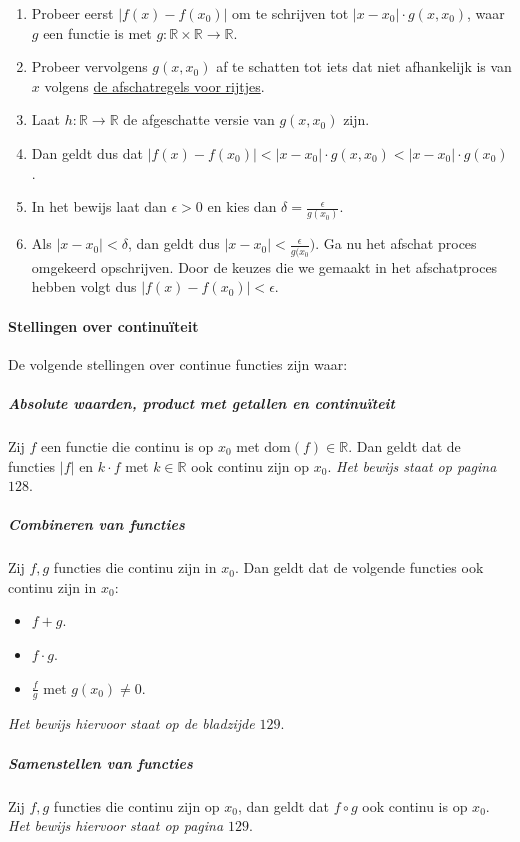 \begin{enumerate}
    \setlength\itemsep{0em}
    \item Probeer eerst $|f(x)-f(x_{0})|$ om te schrijven tot $|x-x_{0}| \cdot g(x,x_{0})$, waar $g$ een functie is met $g:\mathbb{R}\times\mathbb{R}\to\mathbb{R}$.
    \item Probeer vervolgens $g(x,x_{0})$ af te schatten tot iets dat niet afhankelijk is van $x$ volgens \hyperref[sec:afschatten]{de afschatregels voor rijtjes}.
    \item Laat $h:\mathbb{R}\to\mathbb{R}$ de afgeschatte versie van $g(x,x_{0})$ zijn.
    \item Dan geldt dus dat $|f(x)-f(x_{0})|<|x-x_{0}| \cdot g(x,x_{0}) < |x-x_{0}| \cdot g(x_0)$.
    \item In het bewijs laat dan $\epsilon>0$ en kies dan $\delta=\frac{\epsilon}{g(x_{0})}$.
    \item Als $|x-x_{0}|<\delta$, dan geldt dus $|x-x_{0}|<\frac{\epsilon}{g(x_{0}})$. Ga nu het afschat proces omgekeerd opschrijven. Door de keuzes die we gemaakt in het afschatproces hebben volgt dus $|f(x)-f(x_{0})|<\epsilon$.
\end{enumerate}

\paragraph{Stellingen over continuïteit} De volgende stellingen over continue functies zijn waar:

\subparagraph{Absolute waarden, product met getallen en continuïteit} Zij $f$ een functie die continu is op $x_0$ met $\text{dom}(f)\in\mathbb{R}$. Dan geldt dat de functies $|f|$ en $k \cdot f$ met $k\in\mathbb{R}$ ook continu zijn op $x_{0}$. \textit{Het bewijs staat op pagina $128$}.

\subparagraph{Combineren van functies} Zij $f,g$ functies die continu zijn in $x_{0}$. Dan geldt dat de volgende functies ook continu zijn in $x_{0}$:

\begin{itemize}
    \setlength\itemsep{0em}
    \item $f + g$.
    \item $f \cdot g$.
    \item $\frac{f}{g}$ met $g(x_{0})\neq0$.
\end{itemize}

\textit{Het bewijs hiervoor staat op de bladzijde $129$}.

\subparagraph{Samenstellen van functies} Zij $f,g$ functies die continu zijn op $x_{0}$, dan geldt dat $f \circ g$ ook continu is op $x_{0}$. \textit{Het bewijs hiervoor staat op pagina $129$}.

